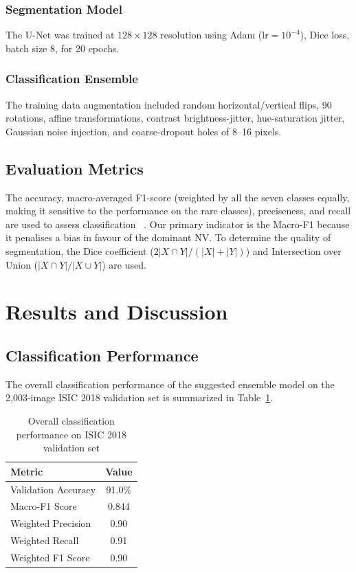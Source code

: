 \documentclass[conference]{IEEEtran}
\begin{document}
\subsubsection{Segmentation Model}
The U-Net was trained at $128{\times}128$ resolution using Adam ($\text{lr}=10^{-4}$), Dice loss, batch size 8, for 20 epochs.

\subsubsection{Classification Ensemble}

The training data augmentation included random horizontal/vertical flips, 90\textdegree{} rotations, affine transformations, contrast brightness-jitter, hue-saturation jitter, Gaussian noise injection, and coarse-dropout holes of 8--16 pixels.



\subsection{Evaluation Metrics}

The accuracy, macro-averaged F1-score (weighted by all the seven classes equally, making it sensitive to the performance on the rare classes), preciseness, and recall are used to assess classification ~\cite{wu2022systematic}. Our primary indicator is the Macro-F1 because it penalises a bias in favour of the dominant NV. To determine the quality of segmentation, the Dice coefficient ($2|X\cap Y|/(|X|+|Y|)$) and Intersection over Union ($|X\cap Y|/|X\cup Y|$) are used.

\section{Results and Discussion}
\label{sec:results}

\subsection{Classification Performance}

The overall classification performance of the suggested ensemble model on the 2,003-image ISIC 2018 validation set is summarized in Table~\ref{tab:classification_results}.

\begin{table}[h]
\centering
\caption{Overall classification performance on ISIC 2018 validation set}
\label{tab:classification_results}
\begin{tabular}{lc}
\hline
Metric & Value \\
\hline
Validation Accuracy & 91.0\% \\
Macro-F1 Score & 0.844 \\
Weighted Precision & 0.90 \\
Weighted Recall & 0.91 \\
Weighted F1 Score & 0.90 \\
\hline
\end{tabular}
\end{table}
\end{document}
